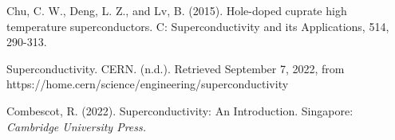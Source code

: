 \documentclass[twoside,twocolumn]{article}
\begin{document}
\begin{thebibliography}{99} %

Chu, C. W., Deng, L. Z., and Lv, B. (2015). \newline
\newblock Hole-doped cuprate high temperature superconductors.
 C: Superconductivity and its Applications, 514, 290-313.

Superconductivity. CERN. (n.d.). 
\newblock Retrieved September 7, 2022, from https://home.cern/science/engineering/superconductivity 

\bibitem[Combescot, 2022]{}Combescot, R. (2022). \newline
Superconductivity: An Introduction.\newline
 \newblock Singapore: {\em Cambridge University Press.}

 
\end{thebibliography}

\end{document}
